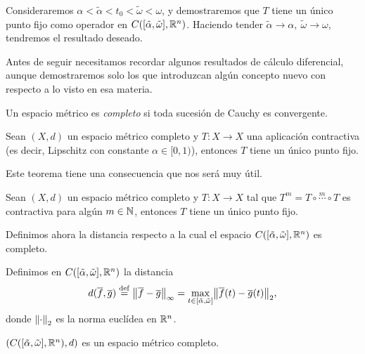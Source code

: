 \documentclass[../ecuaciones_diferenciales.tex]{subfiles}
\begin{document}
Consideraremos \(\alpha < \tilde{\alpha} < t_0 < \tilde{\omega} < \omega\), y
demostraremos que \(T\) tiene un único punto fijo como operador en
\(C([\tilde{\alpha}, \tilde{\omega}], \mathbb{R}^n)\). Haciendo tender \(\tilde{\alpha}
\to \alpha,\ \tilde{\omega} \to \omega\), tendremos el resultado deseado.

Antes de seguir necesitamos recordar algunos resultados de cálculo diferencial,
aunque demostraremos solo los que introduzcan algún concepto nuevo con respecto
a lo visto en esa materia.

\begin{definition}
	Un espacio métrico es \emph{completo} si toda sucesión de Cauchy es convergente.
\end{definition}

\begin{theorem}
	Sean \((X, d)\) un espacio métrico completo y \(T : X \to X\) una aplicación
	contractiva (es decir, Lipschitz con constante \(\alpha \in [0, 1)\)),
	entonces \(T\) tiene un único punto fijo.
\end{theorem}

Este teorema tiene una consecuencia que nos será muy útil.

\begin{corollary} \label{cor:banach_fixed_point}
	Sean \((X, d)\) un espacio métrico completo y \(T : X \to X\) tal que
	\(T^m = T \circ \overset{m}{\cdots} \circ T\) es contractiva para algún
	\(m \in \mathbb{N}\), entonces \(T\) tiene un único punto fijo.
\end{corollary}

Definimos ahora la distancia respecto a la cual el espacio
\(C([\tilde{\alpha}, \tilde{\omega}], \mathbb{R}^n)\) es completo.

\begin{definition}
	Definimos en \(C([\tilde{\alpha}, \tilde{\omega}], \mathbb{R}^n)\) la distancia
	\[d(\vec{f}, \vec{g}) \eqdef \norm{\vec{f} - \vec{g}}_{\infty}
		= \max_{t \in [\tilde{\alpha}, \tilde{\omega}]}
			\norm{\vec{f}(t) - \vec{g}(t)}_2,\]
	donde \(\norm{\cdot}_2\) es la norma euclídea en \(\mathbb{R}^n\).
\end{definition}

\begin{proposition}
	\((C([\tilde{\alpha}, \tilde{\omega}], \mathbb{R}^n), d)\)
	es un espacio métrico completo.
\end{proposition}
\end{document}
